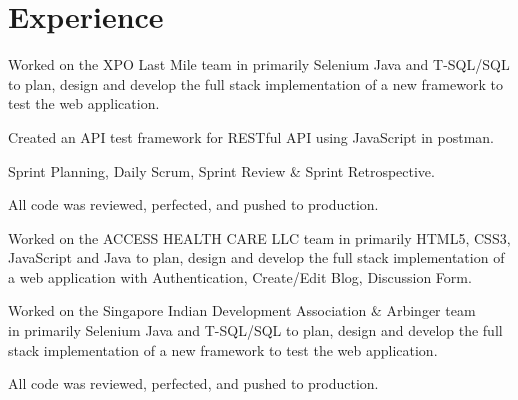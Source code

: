 \documentclass[]{aj-resume-openfont}
\begin{document}
\begin{minipage}[t]{0.66\textwidth} 


\section{Experience}

\vspace{\topsep} %
\begin{tightemize}
\item Worked on the XPO Last Mile team in primarily Selenium Java and T-SQL/SQL\\
to plan, design and develop the full stack implementation of a new framework to \\
test the web application.
\item Created an API test framework for RESTful API using JavaScript in postman.
\item Sprint Planning, Daily Scrum, Sprint Review \& Sprint Retrospective.
\item All code was reviewed, perfected, and pushed to production.
\end{tightemize}
\sectionsep

\begin{tightemize}
\item Worked on the ACCESS HEALTH CARE LLC team in primarily HTML5, CSS3,\\
JavaScript and Java to plan, design and develop the full stack implementation of \\
a web application with Authentication, Create/Edit Blog, Discussion Form.
\item Worked on the  Singapore Indian Development Association \& Arbinger team \\
in primarily Selenium Java and T-SQL/SQL to plan, design and develop the full \\
stack implementation of a new framework to test the web application.
\item All code was reviewed, perfected, and pushed to production.
\end{tightemize}
\sectionsep


\end{minipage}
\end{document}
